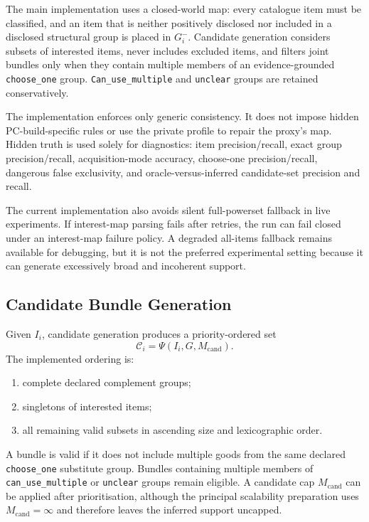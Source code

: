 The main implementation uses a closed-world map: every catalogue item must
be classified, and an item that is neither positively disclosed nor included
in a disclosed structural group is placed in \(G_i^-\). Candidate generation
considers subsets of interested items, never includes excluded items, and
filters joint bundles only when they contain multiple members of an
evidence-grounded \texttt{choose\_one} group. \texttt{Can\_use\_multiple} and
\texttt{unclear} groups are retained conservatively.

The implementation enforces only generic consistency. It does not impose
hidden PC-build-specific rules or use the private profile to repair the
proxy's map. Hidden truth is used solely for diagnostics: item
precision/recall, exact group precision/recall, acquisition-mode accuracy,
choose-one precision/recall, dangerous false exclusivity, and
oracle-versus-inferred candidate-set precision and recall.

The current implementation also avoids silent full-powerset fallback in live experiments. If interest-map parsing fails after retries, the run can fail closed under an interest-map failure policy. A degraded all-items fallback remains available for debugging, but it is not the preferred experimental setting because it can generate excessively broad and incoherent support.

\subsection{Candidate Bundle Generation}

Given \(I_i\), candidate generation produces a priority-ordered set
\[
\mathcal{C}_i=\Psi(I_i,G,M_{\mathrm{cand}}).
\]
The implemented ordering is:
\begin{enumerate}[leftmargin=*]
    \item complete declared complement groups;
    \item singletons of interested items;
    \item all remaining valid subsets in ascending size and lexicographic order.
\end{enumerate}
A bundle is valid if it does not include multiple goods from the same
declared \texttt{choose\_one} substitute group. Bundles containing multiple
members of \texttt{can\_use\_multiple} or \texttt{unclear} groups remain
eligible. A candidate cap \(M_{\mathrm{cand}}\) can be applied after
prioritisation, although the principal scalability preparation uses
\(M_{\mathrm{cand}}=\infty\) and therefore leaves the inferred support
uncapped.

